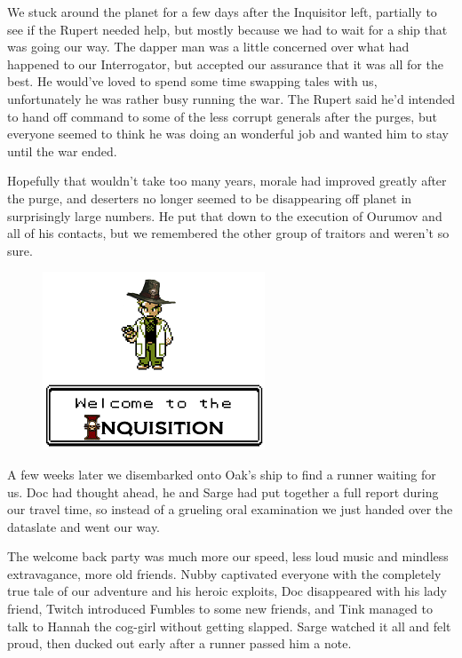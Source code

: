 We stuck around the planet for a few days after the Inquisitor left, partially to see if the Rupert needed help, but mostly because we had to wait for a ship that was going our way. 
The dapper man was a little concerned over what had happened to our Interrogator, but accepted our assurance that it was all for the best. 
He would've loved to spend some time swapping tales with us, unfortunately he was rather busy running the war. 
The Rupert said he'd intended to hand off command to some of the less corrupt generals after the purges, but everyone seemed to think he was doing an wonderful job and wanted him to stay until the war ended.

Hopefully that wouldn't take too many years, morale had improved greatly after the purge, and deserters no longer seemed to be disappearing off planet in surprisingly large numbers. 
He put that down to the execution of Ourumov and all of his contacts, but we remembered the other group of traitors and weren't so sure.

\begin{figure}
	\begin{center}
		\includegraphics[width=\figwidth]{pics/9/61.png}
	\end{center}
\end{figure}
A few weeks later we disembarked onto Oak's ship to find a runner waiting for us. 
Doc had thought ahead, he and Sarge had put together a full report during our travel time, so instead of a grueling oral examination we just handed over the dataslate and went our way.

The welcome back party was much more our speed, less loud music and mindless extravagance, more old friends. 
Nubby captivated everyone with the completely true tale of our adventure and his heroic exploits, Doc disappeared with his lady friend, Twitch introduced Fumbles to some new friends, and Tink managed to talk to Hannah the cog-girl without getting slapped. 
Sarge watched it all and felt proud, then ducked out early after a runner passed him a note.

